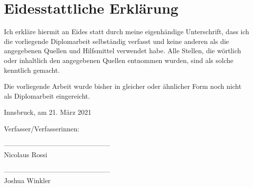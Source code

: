 \section*{Eidesstattliche Erklärung}

Ich erkläre hiermit an Eides statt durch meine eigenhändige Unterschrift, dass ich die vorliegende Diplomarbeit selbständig verfasst und keine anderen als die angegebenen Quellen und Hilfsmittel verwendet habe. Alle Stellen, die wörtlich oder inhaltlich den angegebenen Quellen entnommen wurden, sind als solche kenntlich gemacht.

Die vorliegende Arbeit wurde bisher in gleicher oder ähnlicher Form noch nicht als Diplomarbeit eingereicht.

Innsbruck, am 21. März 2021

\vspace*{3cm}



Verfasser/Verfasserinnen:

\vspace*{2cm}


-----------------------------------------------\\
\hspace*{1.3cm}           Nicolaus Rossi

\vspace*{2cm}


-----------------------------------------------\\
\hspace*{1.3cm}           Joshua Winkler



\newpage
